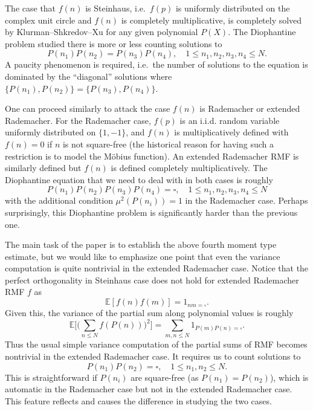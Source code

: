 \documentclass[reqno, 12pt]{amsart}
\theoremstyle{plain}
\theoremstyle{definition}
\theoremstyle{remark}
\renewcommand{\le}{\leqslant}
\begin{document}
The case that $f(n)$ is Steinhaus, i.e.~$f(p)$ is uniformly distributed on the complex unit circle and $f(n)$ is completely multiplicative, is completely solved by Klurman--Shkredov--Xu \cite{KSX23} for any given polynomial $P(X)$. The Diophantine problem studied there is more or less counting solutions to 
\[P(n_1)P(n_2) = P(n_3)P(n_4),  \quad 1\le n_1, n_2, n_3, n_4 \le N. \]
 A paucity phenomenon is required, i.e.~the number of solutions to the equation is dominated by the ``diagonal'' solutions 
 where $\{P(n_1),P(n_2)\} = \{P(n_3),P(n_4)\}$.

One can proceed similarly to attack the case $f(n)$ is Rademacher or extended Rademacher. For the Rademacher case, $f(p)$ is an i.i.d. random variable uniformly distributed on $\{1, -1\}$, and $f(n)$ is multiplicatively defined with $f(n)=0$ if $n$ is not square-free (the historical reason for having such a restriction is to model the M\"{o}bius function).
An extended Rademacher RMF is similarly defined but $f(n)$ is defined completely multiplicatively. The Diophantine equation that we need to deal with in both cases is roughly
\begin{equation}
\label{square-product-4}
P(n_1)P(n_2)P(n_3)P(n_4) = \square,  \quad 1\le n_1, n_2, n_3, n_4 \le N
\end{equation}
with the additional condition $\mu^2(P(n_i)) = 1$ in the Rademacher case.
Perhaps surprisingly, this Diophantine problem is significantly harder than the previous one. 

The main task of the paper is to establish the above fourth moment type estimate, but we would like to emphasize one point that even the variance computation is quite nontrivial in the extended Rademacher case. Notice that the perfect orthogonality in Steinhaus case does not hold for extended Rademacher RMF $f$ as
\[\mathbb{E}[f(n)f(m)] = 1_{nm=\square}.\]
Given this, the variance of the partial sum along polynomial values is roughly
\[\mathbb{E}\Big[\Big(\sum_{n\le N} f(P(n))\Big)^{2}\Big] = \sum_{m,n\le N}1_{P(m)P(n)=\square}.\]
Thus the usual simple variance computation of the partial sums of RMF becomes nontrivial in the extended Rademacher case. It requires us to count solutions to 
\[P(n_1)P(n_2) = \square, \quad 1\le n_1, n_2 \le N.\]
This is straightforward if $P(n_i)$ are square-free (as $P(n_1)=P(n_2)$), which is automatic in the Rademacher case but not in the extended Rademacher case. This feature reflects and causes the difference in studying the two cases. 
\end{document}
